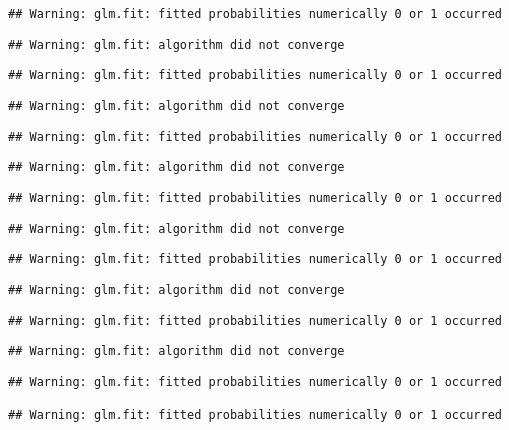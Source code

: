 \documentclass[
]{article}
\begin{document}
\begin{verbatim}
## Warning: glm.fit: fitted probabilities numerically 0 or 1 occurred
\end{verbatim}

\begin{verbatim}
## Warning: glm.fit: algorithm did not converge
\end{verbatim}

\begin{verbatim}
## Warning: glm.fit: fitted probabilities numerically 0 or 1 occurred
\end{verbatim}

\begin{verbatim}
## Warning: glm.fit: algorithm did not converge
\end{verbatim}

\begin{verbatim}
## Warning: glm.fit: fitted probabilities numerically 0 or 1 occurred
\end{verbatim}

\begin{verbatim}
## Warning: glm.fit: algorithm did not converge
\end{verbatim}

\begin{verbatim}
## Warning: glm.fit: fitted probabilities numerically 0 or 1 occurred
\end{verbatim}

\begin{verbatim}
## Warning: glm.fit: algorithm did not converge
\end{verbatim}

\begin{verbatim}
## Warning: glm.fit: fitted probabilities numerically 0 or 1 occurred
\end{verbatim}

\begin{verbatim}
## Warning: glm.fit: algorithm did not converge
\end{verbatim}

\begin{verbatim}
## Warning: glm.fit: fitted probabilities numerically 0 or 1 occurred
\end{verbatim}

\begin{verbatim}
## Warning: glm.fit: algorithm did not converge
\end{verbatim}

\begin{verbatim}
## Warning: glm.fit: fitted probabilities numerically 0 or 1 occurred

## Warning: glm.fit: fitted probabilities numerically 0 or 1 occurred
\end{verbatim}
\end{document}
